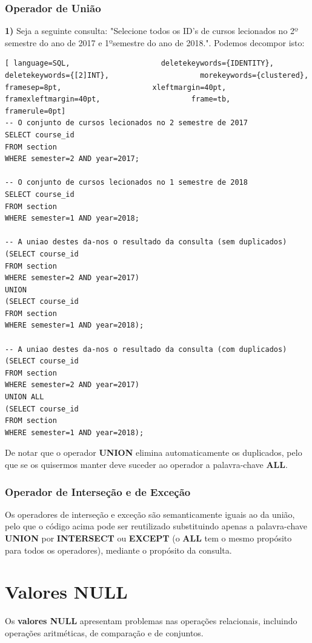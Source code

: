 \documentclass[oneside]{book}
\theoremstyle{definition}
\begin{document}
\subsubsection{Operador de União}
\textbf{1)} Seja a seguinte consulta: "Selecione todos os ID's de cursos lecionados no 2º semestre do ano de 2017 e 1ºsemestre do ano de 2018.". Podemos decompor isto:
\begin{lstlisting}[ language=SQL,                     deletekeywords={IDENTITY},                     deletekeywords={[2]INT},                     morekeywords={clustered},                     framesep=8pt,                     xleftmargin=40pt,                     framexleftmargin=40pt,                     frame=tb,                     framerule=0pt]
-- O conjunto de cursos lecionados no 2 semestre de 2017
SELECT course_id
FROM section
WHERE semester=2 AND year=2017;

-- O conjunto de cursos lecionados no 1 semestre de 2018
SELECT course_id
FROM section
WHERE semester=1 AND year=2018;

-- A uniao destes da-nos o resultado da consulta (sem duplicados)
(SELECT course_id
FROM section
WHERE semester=2 AND year=2017)
UNION
(SELECT course_id
FROM section
WHERE semester=1 AND year=2018);

-- A uniao destes da-nos o resultado da consulta (com duplicados)
(SELECT course_id
FROM section
WHERE semester=2 AND year=2017)
UNION ALL
(SELECT course_id
FROM section
WHERE semester=1 AND year=2018);
\end{lstlisting}

De notar que o operador \textbf{UNION} elimina automaticamente os duplicados, pelo que se os quisermos manter deve suceder ao operador a palavra-chave \textbf{ALL}.

\subsubsection{Operador de Interseção e de Exceção}
Os operadores de interseção e exceção são semanticamente iguais ao da união, pelo que o código acima pode ser reutilizado substituindo apenas a palavra-chave \textbf{UNION} por \textbf{INTERSECT} ou \textbf{EXCEPT} (o \textbf{ALL} tem o mesmo propósito para todos os operadores), mediante o propósito da consulta.

\section{Valores NULL}
Os \textbf{valores NULL} apresentam problemas nas operações relacionais, incluindo operações aritméticas, de comparação e de conjuntos.
\end{document}
